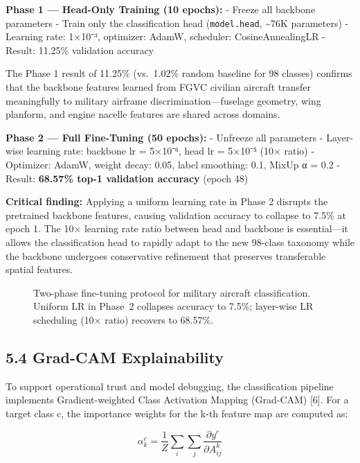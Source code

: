 \documentclass[11pt,a4paper]{article}
\begin{document}
\textbf{Phase 1 --- Head-Only Training (10 epochs):}
- Freeze all backbone parameters
- Train only the classification head (\texttt{model.head}, \textasciitilde76K parameters)
- Learning rate: 1×10⁻³, optimizer: AdamW, scheduler: CosineAnnealingLR
- Result: 11.25\% validation accuracy

The Phase 1 result of 11.25\% (vs.~1.02\% random baseline for 98 classes) confirms that the backbone features learned from FGVC civilian aircraft transfer meaningfully to military airframe discrimination---fuselage geometry, wing planform, and engine nacelle features are shared across domains.

\textbf{Phase 2 --- Full Fine-Tuning (50 epochs):}
- Unfreeze all parameters
- Layer-wise learning rate: backbone lr = 5×10⁻⁶, head lr = 5×10⁻⁵ (10× ratio)
- Optimizer: AdamW, weight decay: 0.05, label smoothing: 0.1, MixUp α = 0.2
- Result: \textbf{68.57\% top-1 validation accuracy} (epoch 48)

\textbf{Critical finding:} Applying a uniform learning rate in Phase 2 disrupts the pretrained backbone features, causing validation accuracy to collapse to 7.5\% at epoch 1. The 10× learning rate ratio between head and backbone is essential---it allows the classification head to rapidly adapt to the new 98-class taxonomy while the backbone undergoes conservative refinement that preserves transferable spatial features.

\begin{figure}[t]
\centering
\resizebox{\textwidth}{!}{}
\caption{Two-phase fine-tuning protocol for military aircraft classification. Uniform LR in Phase~2 collapses accuracy to 7.5\%; layer-wise LR scheduling (10$\times$ ratio) recovers to 68.57\%.}
\label{fig:finetune}
\end{figure}

\hypertarget{grad-cam-explainability}{%
\subsection{5.4 Grad-CAM Explainability}\label{grad-cam-explainability}}

To support operational trust and model debugging, the classification pipeline implements Gradient-weighted Class Activation Mapping (Grad-CAM) [6]. For a target class c, the importance weights for the k-th feature map are computed as:

\[\alpha_k^c = \frac{1}{Z} \sum_i \sum_j \frac{\partial y^c}{\partial A_{ij}^k} \tag{6}\]
\end{document}
